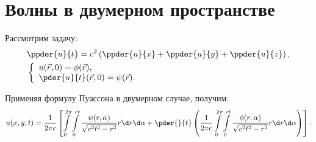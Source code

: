 \section{Волны в двумерном пространстве}

Рассмотрим задачу:
\begin{align*}
    & \ppder{u}{t} =
    c^2\left(\ppder{u}{x} + \ppder{u}{y} + \ppder{u}{z}\right), \\
    & \left\{ \begin{array}{l}
        u(\vec{r}, 0) = \phi(\vec{r}), \\
        \ds \pder{u}{t}(\vec{r}, 0) = \psi(\vec{r}).
    \end{array} \right.
\end{align*}

Применяя формулу Пуассона в двумерном случае, получим:
\[
    u(x, y, t) = \frac{1}{2\pi c}\left[ \int\limits_0^{2\pi}\int\limits_0^{ct}
    \frac{\psi(r, \alpha)}{\sqrt{c^2t^2 - r^2}}r\d r\d\alpha + \pder{}{t}\left(
    \frac{1}{2\pi c}\int\limits_0^{2\pi}\int\limits_0^{ct}\frac{\phi(r, \alpha)}
    {\sqrt{c^2t^2 - r^2}}r\d r\d\alpha\right)\right].
\]
\newpage
